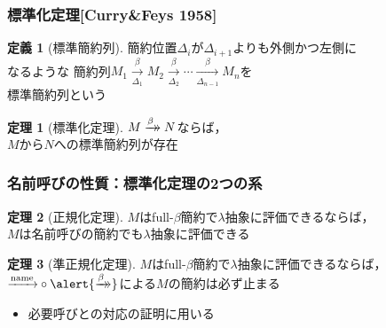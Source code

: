 \documentclass[dvipdfmx,cjk,xcolor=dvipsnames,envcountsect,notheorems,12pt]{beamer}
\theoremstyle{definition}
\newtheorem{definition}{定義}
\newtheorem{theorem}{定理}
\newcommand{\xtwoheadrightarrow}[2][]{%
  \xrightarrow[#1]{#2}\mathrel{\mkern-14mu}\rightarrow
}
\newcommand{\CALLBYNAME}{\xrightarrow{\mathrm{name}}}
\newcommand{\RTCLOSFULLBETA}{\xtwoheadrightarrow{\beta}}
\begin{document}
\begin{frame}
	\frametitle{標準化定理[Curry\&Feys 1958]}
	\large
	\begin{definition}[標準簡約列]
		簡約位置$\Delta_i$が$\Delta_{i+1}$よりも外側かつ左側に\\なるような
		簡約列$M_1\xrightarrow[\Delta_1]{\beta}M_2\xrightarrow[\Delta_2]{\beta} \cdots \xrightarrow[\Delta_{n-1}]{\beta} M_n$を\\標準簡約列という
	\end{definition}
	\begin{theorem}[標準化定理]
		$M\RTCLOSFULLBETA N$ならば，\\$M$から$N$への標準簡約列が存在
	\end{theorem}
\end{frame}

\begin{frame}
	\frametitle{名前呼びの性質：標準化定理の2つの系}
	\large
	\begin{theorem}[正規化定理]
		$M$はfull-$\beta$簡約で$\lambda$抽象に評価できるならば，\\
		$M$は名前呼びの簡約でも$\lambda$抽象に評価できる
	\end{theorem}
	\begin{theorem}[準正規化定理]
		$M$はfull-$\beta$簡約で$\lambda$抽象に評価できるならば，
		${\CALLBYNAME}\circ{\alert{\RTCLOSFULLBETA}}$による$M$の簡約は必ず止まる
	\end{theorem}
	\begin{itemize}
		\item 必要呼びとの対応の証明に用いる
	\end{itemize}
\end{frame}
\end{document}
